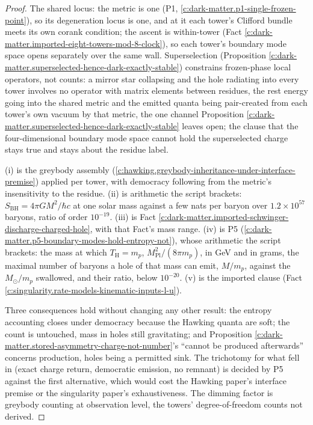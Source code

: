 \documentclass[11pt]{article}
\theoremstyle{definition}
\theoremstyle{plain}
\begin{document}
\begin{proof}
The shared locus: the metric is one (P1, \ref{c:dark-matter.p1-single-frozen-point}), so its degeneration locus is one, and at it each tower's Clifford bundle meets its own corank condition; the ascent is within-tower (Fact \ref{c:dark-matter.imported-eight-towers-mod-8-clock}), so each tower's boundary mode space opens separately over the same wall. Superselection (Proposition \ref{c:dark-matter.superselected-hence-dark-exactly-stable}) constrains frozen-phase local operators, not counts: a mirror star collapsing and the hole radiating into every tower involves no operator with matrix elements between residues, the rest energy going into the shared metric and the emitted quanta being pair-created from each tower's own vacuum by that metric, the one channel Proposition \ref{c:dark-matter.superselected-hence-dark-exactly-stable} leaves open; the clause that the four-dimensional boundary mode space cannot hold the superselected charge stays true and stays about the residue label.

(i) is the greybody assembly (\ref{c:hawking.greybody-inheritance-under-interface-premise}) applied per tower, with democracy following from the metric's insensitivity to the residue. (ii) is arithmetic the script brackets: $S_{\mathrm{BH}} = 4\pi G M^{2}/\hbar c$ at one solar mass against a few nats per baryon over $1.2 \times 10^{57}$ baryons, ratio of order $10^{-19}$. (iii) is Fact \ref{c:dark-matter.imported-schwinger-discharge-charged-hole}, with that Fact's mass range. (iv) is P5 (\ref{c:dark-matter.p5-boundary-modes-hold-entropy-not}), whose arithmetic the script brackets: the mass at which $T_{\mathrm{H}} = m_{p}$, $M_{\mathrm{Pl}}^{2}/(8\pi m_{p})$, in GeV and in grams, the maximal number of baryons a hole of that mass can emit, $M/m_{p}$, against the $M_{\odot}/m_{p}$ swallowed, and their ratio, below $10^{-20}$. (v) is the imported clause (Fact \ref{c:singularity.rate-models-kinematic-inputs-l-u}).

Three consequences hold without changing any other result: the entropy accounting closes under democracy because the Hawking quanta are soft; the count is untouched, mass in holes still gravitating; and Proposition \ref{c:dark-matter.stored-asymmetry-charge-not-number}'s ``cannot be produced afterwards'' concerns production, holes being a permitted sink. The trichotomy for what fell in (exact charge return, democratic emission, no remnant) is decided by P5 against the first alternative, which would cost the Hawking paper's interface premise or the singularity paper's exhaustiveness. The dimming factor is greybody counting at observation level, the towers' degree-of-freedom counts not derived.

\end{proof}
\end{document}
